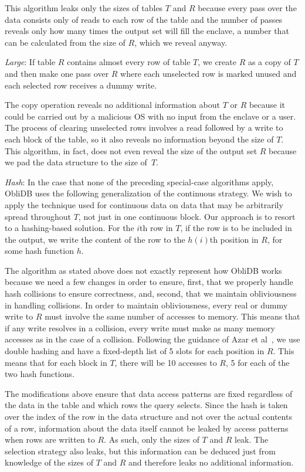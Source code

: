 \documentclass[letterpaper,twocolumn,10pt]{article}
\def\name/{ObliDB}
\begin{document}
This algorithm leaks only the sizes of tables $T$ and $R$ because every pass over the data consists only of reads to each row of the table and the number of passes reveals only how many times the output set will fill the enclave, a number that can be calculated from the size of $R$, which we reveal anyway.

\textit{Large}: If table $R$ contains almost every row of table $T$, we create $R$ as a copy of $T$ and then make one pass over $R$ where each unselected row is marked unused and each selected row receives a dummy write.

The copy operation reveals no additional information about $T$ or $R$ because it could be carried out by a malicious OS with no input from the enclave or a user. The process of clearing unselected rows involves a read followed by a write to each block of the table, so it also reveals no information beyond the size of $T$. This algorithm, in fact, does not even reveal the size of the output set $R$ because we pad the data structure to the size of~$T$.

\textit{Hash}: In the case that none of the preceding special-case algorithms apply, \name/ uses the following generalization of the continuous strategy. We wish to apply the technique used for continuous data on data that may be arbitrarily spread throughout $T$, not just in one continuous block. Our approach is to resort to a hashing-based solution. For the $i$th row in $T$, if the row is to be included in the output, we write the content of the row to the $h(i)$th position in $R$, for some hash function $h$.

The algorithm as stated above does not exactly represent how \name/ works because we need a few changes in order to ensure, first, that we properly handle hash collisions to ensure correctness, and, second, that we maintain obliviousness in handling collisions. In order to maintain obliviousness, every real or dummy write to $R$ must involve the same number of accesses to memory. This means that if any write resolves in a collision, every write must make as many memory accesses as in the case of a collision. Following the guidance of Azar et al~\cite{ABKU99}, we use double hashing and have a fixed-depth list of 5 slots for each position in $R$. This means that for each block in $T$, there will be 10 accesses to $R$, 5 for each of the two hash functions.

The modifications above ensure that data access patterns are fixed regardless of the data in the table and which rows the query selects. Since the hash is taken over the index of the row in the data structure and not over the actual contents of a row, information about the data itself cannot be leaked by access patterns when rows are written to $R$. As such, only the sizes of $T$ and $R$ leak. The selection strategy also leaks, but this information can be deduced just from knowledge of the sizes of $T$ and $R$ and therefore leaks no additional information.
\end{document}
